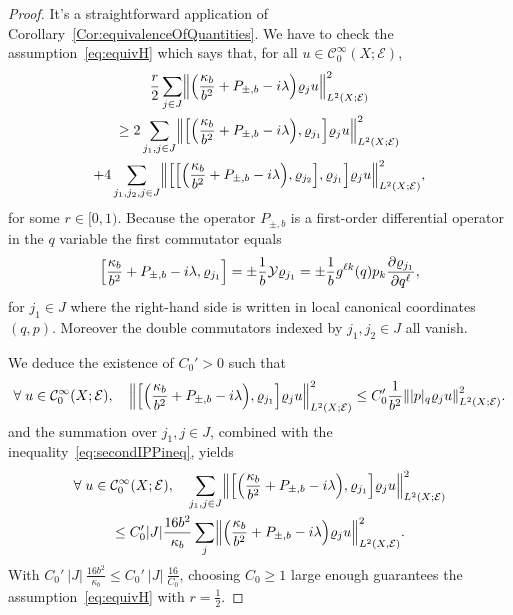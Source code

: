 \documentclass[AHL,Unicode,longabstracts]{cedram}
\newcommand{\clC}{\mathcal{C}}
\newcommand{\clY}{\mathcal{Y}}
\newcommand{\clE}{\mathcal{E}}
\let\oldforall\forall
\renewcommand*{\forall}{\mathrel{\oldforall}}
\let\originalleft\left
\let\originalright\right
\renewcommand{\left}{\mathopen{}\mathclose\bgroup\originalleft}
\renewcommand{\right}{\aftergroup\egroup\originalright}
\begin{document}
\begin{proof}
It's a straightforward application of Corollary~\ref{Cor:equivalenceOfQuantities}. We have to check the assumption~\eqref{eq:equivH} which says that, for all $u\in \clC^{\infty}_{0}(X;\clE)$,
\begin{multline*}
\frac{r}{2} \sum_{j\in J} \left\| \left(\frac{\kappa_{b}}{b^{2}} + P_{\pm,b} - i \lambda\right) \varrho_{j}u \right\|^{2}_{L^{2}(X;\clE)}\\
\geq 2 \sum_{j_{1},j\in J} \left\|\left[\left(\frac{\kappa_{b}}{b^{2}} + P_{\pm,b} - i \lambda\right), \varrho_{j_{1}}\right] \varrho_{j} u \right\|^{2}_{L^{2}(X;\clE)} \\
+ 4 \sum_{j_{1},j_{2},j\in J} \left\|\left[\left[\left(\frac{\kappa_{b}}{b^{2}} + P_{\pm,b} - i \lambda\right),\varrho_{j_{2}}\right],\varrho_{j_{1}}\right]\varrho_{j}u\right\|^{2}_{L^{2}(X;\clE)},
\end{multline*}
for some $r\in[0,1)$. Because the operator $P_{\pm,b}$ is a first-order differential operator in the $q$ variable the first commutator equals
\[
\left[\frac{\kappa_{b}}{b^{2}} + P_{\pm,b} - i \lambda, \varrho_{j_{1}}\right] = \pm \frac{1}{b}\clY\varrho_{j_{1}} = \pm\frac{1}{b}g^{\ell k}(q)p_{k} \frac{\partial \varrho_{j_{1}}}{\partial q^{\ell}},
\]
for $j_{1}\in J$ where the right-hand side is written in local canonical coordinates $(q,p)$. Moreover the double commutators indexed by $j_{1},j_{2}\in J$ all vanish.

We deduce the existence of $C_{0}'>0$ such that
\[
\forall u\in \clC^{\infty}_{0}(X;\clE),\quad\left\|\left[\left(\frac{\kappa_{b}}{b^{2}} + P_{\pm,b} - i \lambda\right), \varrho_{j_{1}}\right] \varrho_{j} u \right\|^{2}_{L^{2}(X;\clE)} \leq C_{0}'\frac{1}{b^{2}} \left\| |p|_{q} \varrho_{j} u \right\|_{L^{2}(X;\clE)}^{2}.
\]
and the summation over $j_{1},j\in J$, combined with the inequality~\eqref{eq:secondIPPineq}, yields
\begin{multline*}
\forall u\in \clC^{\infty}_{0}(X;\clE),\quad \sum_{j_{1},j\in J} \left\|\left[\left(\frac{\kappa_{b}}{b^{2}} + P_{\pm,b} - i \lambda\right), \varrho_{j_{1}}\right] \varrho_{j} u \right\|^{2}_{L^{2}(X;\clE)} \\
\leq C_{0}' |J| \frac{16b^{2}}{\kappa_{b}} \sum_{j} \left\| \left(\frac{\kappa_{b}}{b^{2}}+P_{\pm, b} - i \lambda\right) \varrho_{j}u \right\|^{2}_{L^{2}(X,\clE)}.
\end{multline*}
With $C_{0}'~|J|~\frac{16b^{2}}{\kappa_{b}}\leq C_{0}'~|J|~\frac{16}{C_{0}}$, choosing $C_{0}\geq 1$ large enough guarantees the assumption~\eqref{eq:equivH} with $r=\frac{1}{2}$.
\end{proof}
\end{document}
